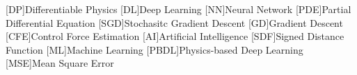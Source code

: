 [DP]{Differentiable Physics}
[DL]{Deep Learning}
[NN]{Neural Network}
[PDE]{Partial Differential Equation}
[SGD]{Stochasitc Gradient Descent}
[GD]{Gradient Descent}
[CFE]{Control Force Estimation}
[AI]{Artificial Intelligence}
[SDF]{Signed Distance Function}
[ML]{Machine Learning}
[PBDL]{Physics-based Deep Learning}
[MSE]{Mean Square Error}
